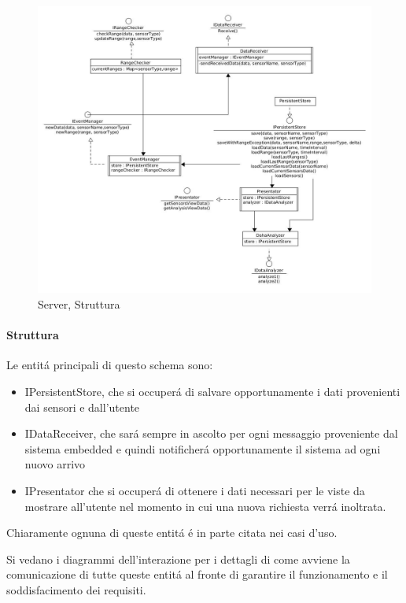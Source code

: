 \begin{figure}[ph]
\centering
\includegraphics[width=\textwidth,height=\textheight,keepaspectratio]{Figures/DomainModel/Server/Structure}
\caption{Server, Struttura}
\end{figure}

\afterpage{\clearpage}

\newpage

\paragraph{Struttura}

Le entit\'a principali di questo schema sono:
\begin{itemize}
  \item IPersistentStore, che si occuper\'a di salvare opportunamente i dati provenienti dai sensori e dall'utente
  \item IDataReceiver, che sar\'a sempre in ascolto per ogni messaggio proveniente dal sistema embedded e quindi notificher\'a opportunamente il sistema ad ogni nuovo arrivo
  \item IPresentator che si occuper\'a di ottenere i dati necessari per le viste da mostrare all'utente nel momento in cui una nuova richiesta verr\'a inoltrata.
\end{itemize}

Chiaramente ognuna di queste entit\'a \'e in parte citata nei casi d'uso.

Si vedano i diagrammi dell'interazione per i dettagli di come avviene la comunicazione di tutte queste entit\'a al fronte di garantire il funzionamento e il soddisfacimento dei requisiti.

